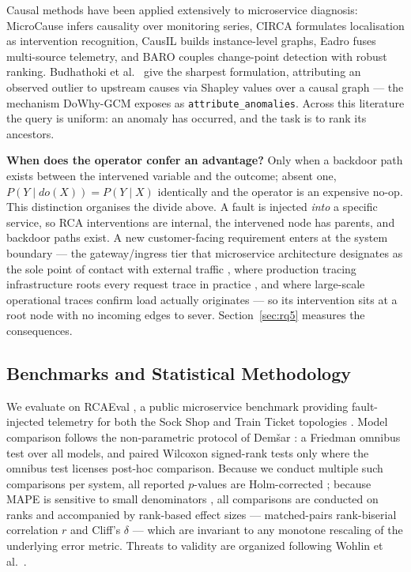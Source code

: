 \documentclass[journal, 10pt]{IEEEtran}
\begin{document}
Causal methods have been applied extensively to microservice diagnosis:
MicroCause \cite{meng2020microcause} infers causality over monitoring series,
CIRCA \cite{li2022circa} formulates localisation as intervention recognition,
CausIL \cite{chakraborty2023causil} builds instance-level graphs, Eadro
\cite{lee2023eadro} fuses multi-source telemetry, and BARO
\cite{nguyen2024baro} couples change-point detection with robust ranking.
Budhathoki et al.\ \cite{budhathoki2022rootcause} give the sharpest formulation,
attributing an observed outlier to upstream causes via Shapley values over a
causal graph --- the mechanism DoWhy-GCM \cite{blobaum2024dowhy,sharma2020dowhy}
exposes as \texttt{attribute\_anomalies}. Across this literature the query is
uniform: an anomaly has occurred, and the task is to rank its ancestors.

\textbf{When does the operator confer an advantage?} Only when a backdoor path
exists between the intervened variable and the outcome; absent one,
$P(Y \mid do(X)) = P(Y \mid X)$ identically and the operator is an expensive
no-op. This distinction organises the divide above. A fault is injected
\emph{into} a specific service, so RCA interventions are internal, the intervened
node has parents, and backdoor paths exist. A new customer-facing requirement
enters at the system boundary --- the gateway/ingress tier that microservice
architecture designates as the sole point of contact with external
traffic \cite{richardson2018microservices}, where production tracing
infrastructure roots every request trace in practice
\cite{sigelman2010dapper}, and where large-scale operational traces confirm
load actually originates \cite{luo2021characterizing} --- so its intervention
sits at a root node with no incoming edges to sever. Section~\ref{sec:rq5}
measures the consequences.


\subsection{Benchmarks and Statistical Methodology}
We evaluate on RCAEval \cite{pham2024rcaeval}, a public microservice benchmark providing fault-injected telemetry for both the Sock Shop and Train Ticket topologies \cite{gan2019deathstarbench}. Model comparison follows the non-parametric protocol of Demšar \cite{demsar2006}: a Friedman omnibus test over all models, and paired Wilcoxon signed-rank tests only where the omnibus test licenses post-hoc comparison. Because we conduct multiple such comparisons per system, all reported $p$-values are Holm-corrected \cite{holm1979}; because MAPE is sensitive to small denominators \cite{hyndman2006accuracy}, all comparisons are conducted on ranks and accompanied by rank-based effect sizes --- matched-pairs rank-biserial correlation $r$ and Cliff's $\delta$ \cite{cliff1993dominance} --- which are invariant to any monotone rescaling of the underlying error metric. Threats to validity are organized following Wohlin et al.\ \cite{wohlin2012experimentation}.
\end{document}
